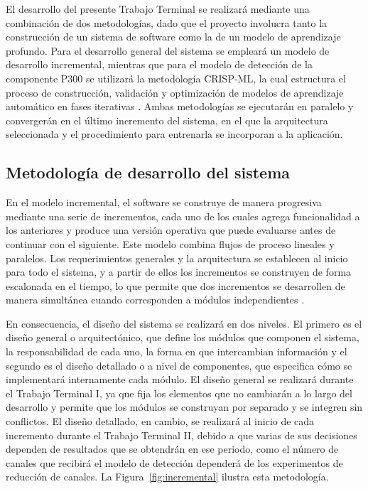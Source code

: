 El desarrollo del presente Trabajo Terminal se realizará mediante una combinación de dos
metodologías, dado que el proyecto involucra tanto la construcción de un sistema de software como
la de un modelo de aprendizaje profundo. Para el desarrollo general del sistema se empleará un
modelo de desarrollo incremental, mientras que para el modelo de detección de la componente P300 se
utilizará la metodología CRISP-ML, la cual estructura el proceso de construcción, validación y
optimización de modelos de aprendizaje automático en fases iterativas \cite{studer2021}. Ambas
metodologías se ejecutarán en paralelo y convergerán en el último incremento del sistema, en el que
la arquitectura seleccionada y el procedimiento para entrenarla se incorporan a la aplicación.

\subsection{Metodología de desarrollo del sistema}
\label{sec:met-sistema}

En el modelo incremental, el software se construye de manera progresiva mediante una serie de
incrementos, cada uno de los cuales agrega funcionalidad a los anteriores y produce una versión
operativa que puede evaluarse antes de continuar con el siguiente. Este modelo combina flujos de
proceso lineales y paralelos. Los requerimientos generales y la arquitectura se establecen al
inicio para todo el sistema, y a partir de ellos los incrementos se construyen de forma escalonada
en el tiempo, lo que permite que dos incrementos se desarrollen de manera simultánea cuando
corresponden a módulos independientes \cite{pressman2010}.

En consecuencia, el diseño del sistema se realizará en dos niveles. El primero es el diseño
general o arquitectónico, que define los módulos que componen el sistema, la responsabilidad de
cada uno, la forma en que intercambian información y el segundo es el diseño detallado o a nivel
de componentes, que especifica cómo se implementará internamente cada módulo. El diseño general se realizará durante el Trabajo Terminal I, ya que fija los
elementos que no cambiarán a lo largo del desarrollo y permite que los módulos se construyan por
separado y se integren sin conflictos. El diseño detallado, en cambio, se realizará al inicio de
cada incremento durante el Trabajo Terminal II, debido a que varias de sus decisiones dependen de
resultados que se obtendrán en ese periodo, como el número de canales que recibirá el
modelo de detección dependerá de los experimentos de reducción de canales. La
Figura~\ref{fig:incremental} ilustra esta metodología.

